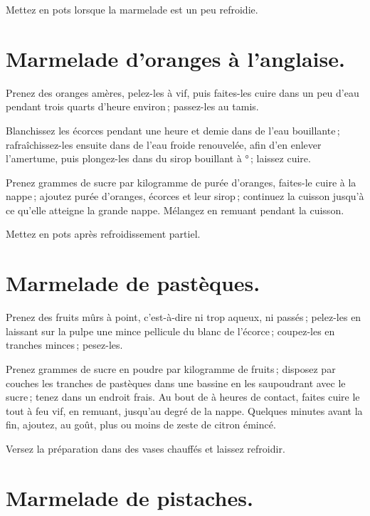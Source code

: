 Mettez en pots lorsque la marmelade est un peu refroidie.

\section*{\centering Marmelade d’oranges à l'anglaise.}
{}

Prenez des oranges amères, pelez-les à vif, puis faites-les cuire dans un peu
d'eau pendant trois quarts d'heure environ ; passez-les au tamis.

Blanchissez les écorces pendant une heure et demie dans de l'eau bouillante ;
rafraîchissez-les ensuite dans de l'eau froide renouvelée, afin d'en enlever
l'amertume, puis plongez-les dans du sirop bouillant à {\mmm}° ; laissez
cuire.

Prenez {\mmm} grammes de sucre par kilogramme de purée d'oranges,
faites-le cuire à la nappe ; ajoutez purée d'oranges, écorces et leur sirop ;
continuez la cuisson jusqu'à ce qu'elle atteigne la grande nappe. Mélangez en
remuant pendant la cuisson.

Mettez en pots après refroidissement partiel.

\section*{\centering Marmelade de pastèques.}
{}

Prenez des fruits mûrs à point, c'est-à-dire ni trop aqueux, ni passés ;
pelez-les en laissant sur la pulpe une mince pellicule du blanc de l'écorce ;
coupez-les en tranches minces ; pesez-les.

Prenez {\mmm} grammes de sucre en poudre par kilogramme de fruits ;
disposez par couches les tranches de pastèques dans une bassine en les
saupoudrant avec le sucre ; tenez dans un endroit frais. Au bout de {\mmm}
à {\mmm} heures de contact, faites cuire le tout à feu vif, en remuant,
jusqu'au degré de la nappe. Quelques minutes avant la fin, ajoutez, au goût,
plus ou moins de zeste de citron émincé.

Versez la préparation dans des vases chauffés et laissez refroidir.

\section*{\centering Marmelade de pistaches.}
{}

